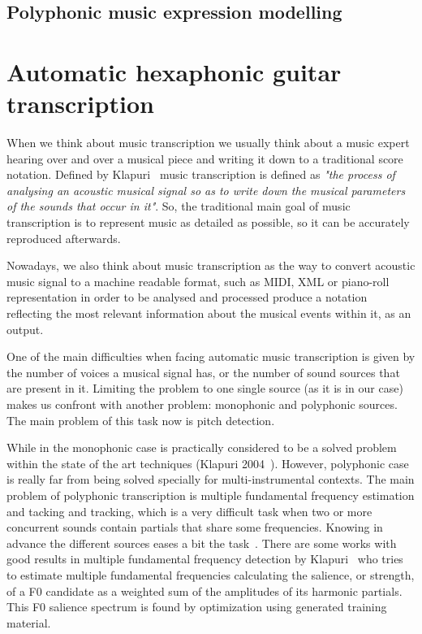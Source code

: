 \subsection{Polyphonic music expression modelling}
\label{sec:polymuexpmod}

\section{Automatic hexaphonic guitar transcription}
\label{sec:autohexaguit}
When we think about music transcription we usually think about a music expert hearing over and over a musical piece and writing it down to a traditional score notation. Defined by Klapuri~\cite{Klapuri2004} music transcription is defined as \textit{"the process of analysing an acoustic musical signal so as to write down the musical parameters of the sounds that occur in it"}. So, the traditional main goal of music transcription is to represent music as detailed as possible, so it can be accurately reproduced afterwards. 

Nowadays, we also think about music transcription as the way to convert acoustic music signal to a machine readable format, such as MIDI, XML or piano-roll representation in order to be analysed and processed produce a notation reflecting the most relevant information about the musical events within it, as an output. 	

One of the main difficulties when facing automatic music transcription is given by the number of voices a musical signal has, or the number of sound sources that are present in it. Limiting the problem to one single source (as it is in our case) makes us confront with another problem: monophonic and polyphonic sources. The main problem of this task now is pitch detection. 

While in the monophonic case is practically considered to be a solved problem within the state of the art techniques (Klapuri 2004~\cite{Klapuri2004}). However, polyphonic case is really far from being solved specially for multi-instrumental contexts. The main problem of polyphonic transcription is multiple fundamental frequency estimation and tacking and tracking, which is a very difficult task when two or more concurrent sounds contain partials that share some frequencies. Knowing in advance the different sources eases a bit the task~\cite{argenti2011}. There are some works with good results in multiple fundamental frequency detection by Klapuri~\cite{Klapuri2006} who tries to estimate multiple fundamental frequencies calculating the salience, or strength, of a F0 candidate as a weighted sum of the amplitudes of its harmonic partials. This F0 salience spectrum is found by optimization using generated training material.

